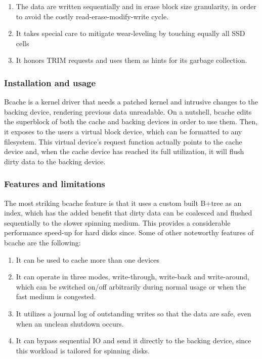 \begin{enumerate}
	\item The data are written sequentially and in erase block size 
		granularity, in order to avoid the costly read-erase-modify-write 
		cycle.
	\item It takes special care to mitigate wear-leveling by touching equally 
		all SSD cells
	\item It honors TRIM requests and uses them as hints for its garbage 
		collection.
\end{enumerate}

\subsubsection{Installation and usage}

Bcache is a kernel driver that needs a patched kernel and intrusive changes to 
the backing device, rendering previous data unreadable. On a nutshell, bcache 
edits the superblock of both the cache and backing devices in order to use 
them.  Then, it exposes to the users a virtual block device, which can be 
formatted to any filesystem.  This virtual device's request function actually 
points to the cache device and, when the cache device has reached its full 
utilization, it will flush dirty data to the backing device.

\subsubsection{Features and limitations}

The most striking bcache feature is that it uses a custom built B+tree as an 
index, which has the added benefit that dirty data can be coalesced and flushed 
sequentially to the slower spinning medium. This provides a considerable 
performance speed-up for hard disks since. Some of other noteworthy features of 
bcache are the following:

\begin{enumerate}
	\item It can be used to cache more than one devices
	\item It can operate in three modes, write-through, write-back and 
		write-around, which can be switched on/off arbitrarily during normal 
		usage or when the fast medium is congested.
	\item It utilizes a journal log of outstanding writes so that the data are 
		safe, even when an unclean shutdown occurs.
	\item It can bypass sequential IO and send it directly to the backing 
		device, since this workload is tailored for spinning disks.
\end{enumerate}

